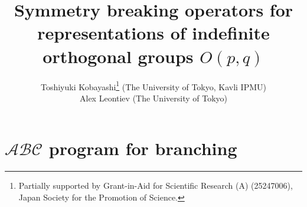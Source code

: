 \documentclass[12pt]{article} %
\theoremstyle{definition}
\theoremstyle{exampstyle} \newtheorem{examp}[theorem]{Theorem}
\begin{document}
\title{Symmetry breaking operators for representations of indefinite orthogonal groups $O(p,q)$}

\author{Toshiyuki Kobayashi\thanks{Partially supported by Grant-in-Aid for Scientific
	Research (A) (25247006), Japan Society for the Promotion of Science.} (The University of Tokyo, Kavli IPMU)\\
  Alex Leontiev (The University of Tokyo)}




  \maketitle
  \section{$\mathcal{ABC}$ program for branching}
\end{document}
